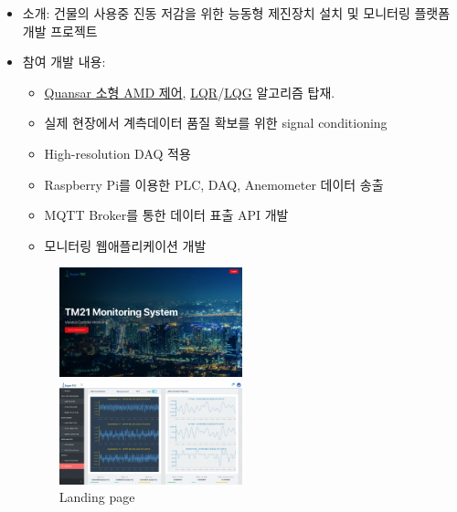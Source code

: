 \documentclass[10pt,a4paper,ragged2e]{altacv}
\begin{document}
\begin{fullwidth}

\begin{itemize}
\item 소개: 건물의 사용중 진동 저감을 위한 능동형 제진장치 설치 및 모니터링 플랫폼 개발 프로젝트
\item 참여 개발 내용:
  \begin{itemize}
    \item \href{http://www.quanser.com/products/active_mass_damper}{Quansar 소형 AMD 제어}, \href{https://en.wikipedia.org/wiki/Linear-quadratic_regulator}{LQR}/\href{https://en.wikipedia.org/wiki/Linear-quadratic-Gaussian_control}{LQG} 알고리즘 탑재.
    \item 실제 현장에서 계측데이터 품질 확보를 위한 signal conditioning
    \item High-resolution DAQ 적용
    \item Raspberry Pi를 이용한 PLC, DAQ, Anemometer 데이터 송출
    \item MQTT Broker를 통한 데이터 표출 API 개발
    \item 모니터링 웹애플리케이션 개발
  \end{itemize}
  \begin{figure}[!ht]
    \begin{fullwidth}
      \parbox{0.5\textwidth}{
      \centering
      \includegraphics[width=0.5\textwidth]{images/TM21 Vibration Controller Monitroing - landing.png}
      \caption*{Landing page}
      }\qquad
      \parbox{0.5\textwidth}{
      \centering
      \includegraphics[width=0.5\textwidth]{images/TM21 Vibration Controller Monitroing - amd1}
}
\end{fullwidth}
\end{figure}
\end{itemize}
\end{fullwidth}
\end{document}
